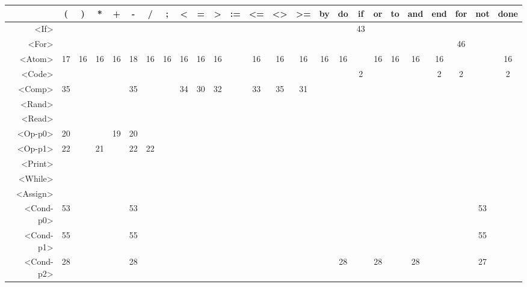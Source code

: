 \begin{tabular}{r|c@{ }c@{ }c@{ }c@{ }c@{ }c@{ }c@{ }c@{ }c@{ }c@{ }c@{ }c@{ }c@{ }c@{ }c@{ }c@{ }c@{ }c@{ }c@{ }c@{ }c@{ }c@{ }c@{ }c@{ }}
 & ( & ) & * & + & - & / & ; & < & = & > & := & <= & <> & >= & by & do & if & or & to & and & end & for & not & done \\\hline
<If> &   &   &   &   &   &   &   &   &   &   &   &   &   &   &   &   & 43 &   &   &   &   &   &   &   \\\hline
<For> &   &   &   &   &   &   &   &   &   &   &   &   &   &   &   &   &   &   &   &   &   & 46 &   &   \\\hline
<Atom> & 17 & 16 & 16 & 16 & 18 & 16 & 16 & 16 & 16 & 16 &   & 16 & 16 & 16 & 16 & 16 &   & 16 & 16 & 16 & 16 &   &   & 16 \\\hline
<Code> &   &   &   &   &   &   &   &   &   &   &   &   &   &   &   &   & 2 &   &   &   & 2 & 2 &   & 2 \\\hline
<Comp> & 35 &   &   &   & 35 &   &   & 34 & 30 & 32 &   & 33 & 35 & 31 &   &   &   &   &   &   &   &   &   &   \\\hline
<Rand> &   &   &   &   &   &   &   &   &   &   &   &   &   &   &   &   &   &   &   &   &   &   &   &   \\\hline
<Read> &   &   &   &   &   &   &   &   &   &   &   &   &   &   &   &   &   &   &   &   &   &   &   &   \\\hline
<Op-p0> & 20 &   &   & 19 & 20 &   &   &   &   &   &   &   &   &   &   &   &   &   &   &   &   &   &   &   \\\hline
<Op-p1> & 22 &   & 21 &   & 22 & 22 &   &   &   &   &   &   &   &   &   &   &   &   &   &   &   &   &   &   \\\hline
<Print> &   &   &   &   &   &   &   &   &   &   &   &   &   &   &   &   &   &   &   &   &   &   &   &   \\\hline
<While> &   &   &   &   &   &   &   &   &   &   &   &   &   &   &   &   &   &   &   &   &   &   &   &   \\\hline
<Assign> &   &   &   &   &   &   &   &   &   &   &   &   &   &   &   &   &   &   &   &   &   &   &   &   \\\hline
<Cond-p0> & 53 &   &   &   & 53 &   &   &   &   &   &   &   &   &   &   &   &   &   &   &   &   &   & 53 &   \\\hline
<Cond-p1> & 55 &   &   &   & 55 &   &   &   &   &   &   &   &   &   &   &   &   &   &   &   &   &   & 55 &   \\\hline
<Cond-p2> & 28 &   &   &   & 28 &   &   &   &   &   &   &   &   &   &   & 28 &   & 28 &   & 28 &   &   & 27 &   \\\hline

\end{tabular}
